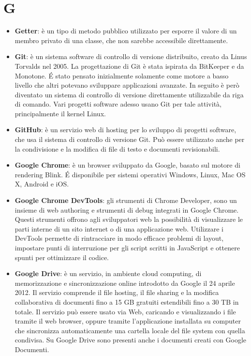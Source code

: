 \section{G}
\begin{itemize}
	\item
	\textbf{Getter}: è un tipo di metodo pubblico utilizzato per esporre il valore di un membro privato di una classe, che non sarebbe accessibile direttamente. 
	\item
	\textbf{Git}: è un sistema software di controllo di versione distribuito, creato da Linus Torvalds nel 2005.
	La progettazione di Git è stata ispirata da BitKeeper e da Monotone. \'E stato pensato inizialmente solamente come motore a basso livello che altri potevano sviluppare applicazioni avanzate. In seguito è però diventato un sistema di controllo di versione direttamente utilizzabile da riga di comando. Vari progetti software adesso usano Git per tale attività, principalmente il kernel Linux.
	\item
	\textbf{GitHub}: è un servizio web di hosting per lo sviluppo di progetti software, che usa il sistema di controllo di versione Git. Può essere utilizzato anche per la condivisione e la modifica di file di testo e documenti revisionabili. 
	\item
	\textbf{Google Chrome}: è un browser sviluppato da Google, basato sul motore di rendering Blink. \'E disponibile per sistemi operativi Windows, Linux, Mac OS X, Android e iOS. 
	\item
	\textbf{Google Chrome DevTools}: gli strumenti di Chrome Developer, sono un insieme di web authoring e strumenti di debug integrati in Google Chrome. Questi strumenti offrono agli sviluppatori web la possibilità di visualizzare le parti interne di un sito internet o di una applicazione web. Utilizzare i DevTools permette di rintracciare in modo efficace problemi di layout, impostare punti di interruzione per gli script scritti in JavaScript e ottenere spunti per ottimizzare il codice.
	\item
	\textbf{Google Drive}: è un servizio, in ambiente cloud computing, di memorizzazione e sincronizzazione online introdotto da Google il 24 aprile 2012. Il servizio comprende il file hosting, il file sharing e la modifica collaborativa di documenti fino a 15 GB gratuiti estendibili fino a 30 TB in totale. Il servizio può essere usato via Web, caricando e visualizzando i file tramite il web browser, oppure tramite l'applicazione installata su computer che sincronizza automaticamente una cartella locale del file system con quella condivisa. Su Google Drive sono presenti anche i documenti creati con Google Documenti.
\end{itemize}